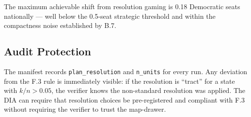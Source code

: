 The maximum achievable shift from resolution gaming is 0.18 Democratic seats
nationally --- well below the 0.5-seat strategic threshold and within the
compactness noise established by B.7.

\subsection{Audit Protection}

The manifest records \texttt{plan\_resolution} and \texttt{n\_units}
for every run. Any deviation from the F.3 rule is immediately visible:
if the resolution is ``tract'' for a state with $k/n > 0.05$, the verifier
knows the non-standard resolution was applied.
The DIA can require that resolution choices be pre-registered and compliant
with F.3 without requiring the verifier to trust the map-drawer.
